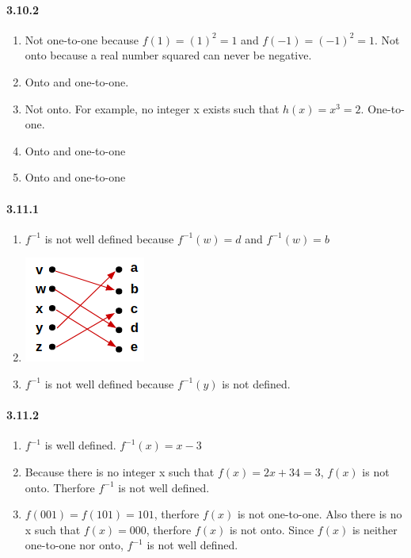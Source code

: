 \documentclass[11pt, letterpaper, twocolumn, fleqn]{article}
\begin{document}
    \paragraph{3.10.2}
    \renewcommand{\labelenumi}{\alph{enumi}.}
    \begin{enumerate}
        \item Not one-to-one because $f(1)=(1)^2=1$ and $f(-1)=(-1)^2=1$. \newline
        Not onto because a real number squared can never be negative.
        \item Onto and one-to-one.
        \item Not onto. For example, no integer x exists such that $h(x)=x^3=2$. One-to-one.
        \addtocounter{enumi}{2}
        \item Onto and one-to-one
        \addtocounter{enumi}{3}
        \item Onto and one-to-one
    \end{enumerate}
    
    \paragraph{3.11.1}
    \renewcommand{\labelenumi}{\alph{enumi}.}
    \begin{enumerate}
        \item $f^{-1}$ is not well defined because $f^{-1}(w) = d$ and $f^{-1}(w) = b$
        \item \includegraphics{3111b}
        \item $f^{-1}$ is not well defined because $f^{-1}(y)$ is not defined.
    \end{enumerate}
    
    \paragraph{3.11.2}
    \renewcommand{\labelenumi}{\alph{enumi}.}
    \begin{enumerate}
        \item $f^{-1}$ is well defined. $f^{-1}(x)=x-3$
        \item Because there is no integer x such that $f(x)=2x+34=3$, $f(x)$ is not onto. Therfore $f^{-1}$ is not well defined.
        \addtocounter{enumi}{3}
        \item $f(001)=f(101)=101$, therfore $f(x)$ is not one-to-one. Also there is no x such that $f(x)=000$, therfore $f(x)$ is not onto. Since $f(x)$ is neither one-to-one nor onto, $f^{-1}$ is not well defined.
    \end{enumerate}
    
\end{document}
